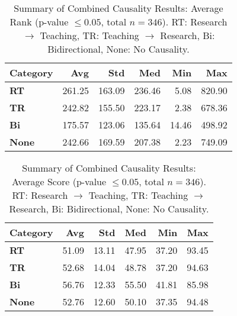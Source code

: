 \documentclass[a4paper, conference]{IEEEtran}
\begin{document}
\begin{table}
	\centering
	\caption{Summary of Combined Causality Results: Average Rank (p-value $\leq 0.05$, total $n=346$). RT: Research $\rightarrow$ Teaching, TR: Teaching $\rightarrow$ Research, Bi: Bidirectional, None: No Causality.}
	\label{tab:category_average}
		\begin{tabular}{|l|r|r|r|r|r|}
			\hline
			\textbf{Category} & \textbf{Avg} & \textbf{Std} & \textbf{Med} & \textbf{Min} & \textbf{Max} \\ \hline
			\textbf{RT}           & 261.25  & 163.09  & 236.46  & 5.08    & 820.90  \\ \hline
			\textbf{TR}           & 242.82  & 155.50  & 223.17  & 2.38    & 678.36  \\ \hline
			\textbf{Bi}           & 175.57  & 123.06  & 135.64  & 14.46   & 498.92  \\ \hline
			\textbf{None}         & 242.66  & 169.59  & 207.38  & 2.23    & 749.09  \\ \hline
		\end{tabular}
\end{table}

\begin{table}
	\centering
	\caption{Summary of Combined Causality Results: Average Score (p-value $\leq 0.05$, total $n=346$). RT: Research $\rightarrow$ Teaching, TR: Teaching $\rightarrow$ Research, Bi: Bidirectional, None: No Causality.}
		\label{tab:category_score}
		\begin{tabular}{|l|r|r|r|r|r|}
			\hline
			\textbf{Category} & \textbf{Avg} & \textbf{Std} & \textbf{Med} & \textbf{Min} & \textbf{Max} \\ \hline
			\textbf{RT}           & 51.09  & 13.11  & 47.95  & 37.20  & 93.45  \\ \hline
			\textbf{TR}           & 52.68  & 14.04  & 48.78  & 37.20  & 94.63  \\ \hline
			\textbf{Bi}           & 56.76  & 12.33  & 55.50  & 41.81  & 85.98  \\ \hline
			\textbf{None}         & 52.76  & 12.60  & 50.10  & 37.35  & 94.48  \\ \hline
		\end{tabular}
\end{table}
\end{document}
